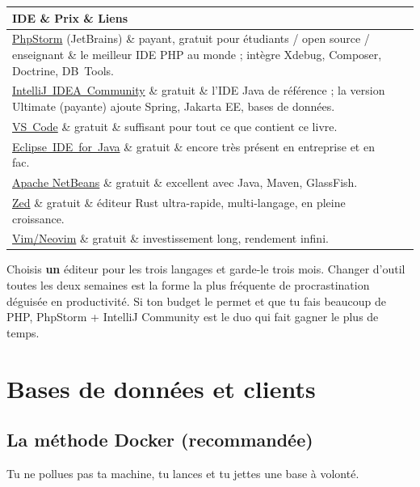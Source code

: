 \documentclass[12pt,a4paper,twoside,openright]{book}
\makeatletter
\newcommand{\link}[2]{\href{#2}{#1}}
\newenvironment{tabz}[1]{\rowcolors{2}{white}{tralight}%
  \small\setlength{\tabcolsep}{5pt}\setlength{\LTpre}{3pt}\setlength{\LTpost}{3pt}%
  \begin{longtable}{@{}#1@{}}\toprule}
  {\bottomrule\end{longtable}\normalfont\setlength{\tabcolsep}{6pt}}
\newcommand{\thd}[1]{\textbf{\color{white}#1}}
\newcommand{\headrow}{\rowcolor{theadbg}}
\makeatother
\begin{document}
\begin{tabz}{XlX}
  \headrow \thd{IDE} \& \thd{Prix} \& \thd{Liens} \\
  \midrule
  \link{PhpStorm}{https://www.jetbrains.com/phpstorm/} (JetBrains) \& payant, gratuit pour \'etudiants / open source / enseignant \& le meilleur IDE PHP au monde ; int\`egre Xdebug, Composer, Doctrine, DB~Tools. \\
  \link{IntelliJ~IDEA~Community}{https://www.jetbrains.com/idea/download/} \& gratuit \& l'IDE Java de r\'ef\'erence ; la version Ultimate (payante) ajoute Spring, Jakarta EE, bases de donn\'ees. \\
  \link{VS~Code}{https://code.visualstudio.com/} \& gratuit \& suffisant pour tout ce que contient ce livre. \\
  \link{Eclipse~IDE~for~Java}{https://www.eclipse.org/downloads/} \& gratuit \& encore tr\`es pr\'esent en entreprise et en fac. \\
  \link{Apache NetBeans}{https://netbeans.apache.org/download/index.html} \& gratuit \& excellent avec Java, Maven, GlassFish. \\
  \link{Zed}{https://zed.dev/} \& gratuit \& \'editeur Rust ultra-rapide, multi-langage, en pleine croissance. \\
  \link{Vim/Neovim}{https://neovim.io/} \& gratuit \& investissement long, rendement infini. \\
\end{tabz}

\begin{astuce}
Choisis \textbf{un} \'editeur pour les trois langages et garde-le trois mois. Changer d'outil
 toutes les deux semaines est la forme la plus fr\'equente de procrastination d\'eguis\'ee en
 productivit\'e. Si ton budget le permet et que tu fais beaucoup de PHP, PhpStorm + IntelliJ
 Community est le duo qui fait gagner le plus de temps.
\end{astuce}

\section{Bases de donn\'ees et clients}

\subsection{La m\'ethode Docker (recommand\'ee)}

Tu ne pollues pas ta machine, tu lances et tu jettes une base \`a volont\'e.
\end{document}
